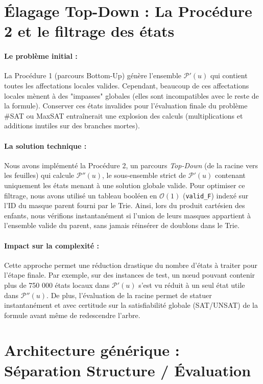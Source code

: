 \documentclass[11pt,a4paper]{report}
\begin{document}
\section{Élagage Top-Down : La Procédure 2 et le filtrage des états}

\paragraph{Le problème initial :}
La Procédure 1 (parcours Bottom-Up) génère l'ensemble $\mathcal{P}'(u)$ qui contient toutes les affectations locales valides. Cependant, beaucoup de ces affectations locales mènent à des "impasses" globales (elles sont incompatibles avec le reste de la formule). Conserver ces états invalides pour l'évaluation finale du problème \#SAT ou MaxSAT entraînerait une explosion des calculs (multiplications et additions inutiles sur des branches mortes).

\paragraph{La solution technique :}
Nous avons implémenté la Procédure 2, un parcours \textit{Top-Down} (de la racine vers les feuilles) qui calcule $\mathcal{P}''(u)$, le sous-ensemble strict de $\mathcal{P}'(u)$ contenant uniquement les états menant à une solution globale valide. 
Pour optimiser ce filtrage, nous avons utilisé un tableau booléen en $\mathcal{O}(1)$ (\texttt{valid\_F}) indexé sur l'ID du masque parent fourni par le Trie. Ainsi, lors du produit cartésien des enfants, nous vérifions instantanément si l'union de leurs masques appartient à l'ensemble valide du parent, sans jamais réinsérer de doublons dans le Trie.

\paragraph{Impact sur la complexité :}
Cette approche permet une réduction drastique du nombre d'états à traiter pour l'étape finale. Par exemple, sur des instances de test, un nœud pouvant contenir plus de 750 000 états locaux dans $\mathcal{P}'(u)$ s'est vu réduit à un seul état utile dans $\mathcal{P}''(u)$. De plus, l'évaluation de la racine permet de statuer instantanément et avec certitude sur la satisfiabilité globale (SAT/UNSAT) de la formule avant même de redescendre l'arbre.

\section{Architecture générique : Séparation Structure / Évaluation}
\end{document}
